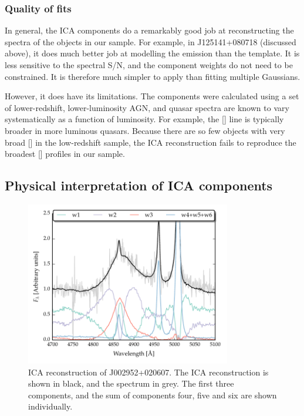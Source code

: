 \subsubsection{Quality of fits}

In general, the \ac{ICA} components do a remarkably good job at reconstructing the spectra of the objects in our sample. 
For example, in J125141+080718 (discussed above), it does much better job at modelling the  emission than the \citet{boroson92} template. 
It is less sensitive to the spectral \ac{S/N}, and the component weights do not need to be constrained. 
It is therefore much simpler to apply than fitting multiple Gaussians. 

However, it does have its limitations. 
The components were calculated using a set of lower-redshift, lower-luminosity \ac{AGN}, and quasar spectra are known to vary systematically as a function of luminosity. 
For example, the [] line is typically broader in more luminous quasars. 
Because there are so few objects with very broad [] in the low-redshift sample, the \ac{ICA} reconstruction fails to reproduce the broadest [] profiles in our sample. 

\subsection{Physical interpretation of \ac{ICA} components}

\begin{figure}
    \centering
    \includegraphics[width=0.8\textwidth]{figures/chapter04/mfica_components.pdf} 
    \caption{\ac{ICA} reconstruction of J002952+020607. The \ac{ICA} reconstruction is shown in black, and the spectrum in grey. The first three components, and the sum of components four, five and six are shown individually.}     
    \label{fig:mfica_components}
\end{figure}


